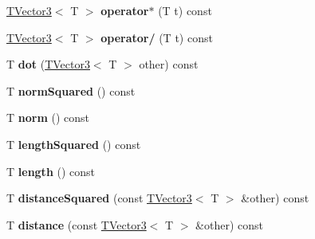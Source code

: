 \begin{DoxyCompactItemize}
\item 
\hyperlink{classAudio_1_1TVector3}{T\+Vector3}$<$ T $>$ {\bfseries operator$\ast$} (T t) const \hypertarget{classAudio_1_1TVector3_a581ab47cd6093c0aee581de38e1a16db}{}\label{classAudio_1_1TVector3_a581ab47cd6093c0aee581de38e1a16db}

\item 
\hyperlink{classAudio_1_1TVector3}{T\+Vector3}$<$ T $>$ {\bfseries operator/} (T t) const \hypertarget{classAudio_1_1TVector3_a422ce062d4d74beb7007a78c7d772594}{}\label{classAudio_1_1TVector3_a422ce062d4d74beb7007a78c7d772594}

\item 
T {\bfseries dot} (\hyperlink{classAudio_1_1TVector3}{T\+Vector3}$<$ T $>$ other) const \hypertarget{classAudio_1_1TVector3_a5aaa68fc33a2401c757ae2b02823007c}{}\label{classAudio_1_1TVector3_a5aaa68fc33a2401c757ae2b02823007c}

\item 
T {\bfseries norm\+Squared} () const \hypertarget{classAudio_1_1TVector3_a72ce6a388a36332a3b3a05c8e5144eef}{}\label{classAudio_1_1TVector3_a72ce6a388a36332a3b3a05c8e5144eef}

\item 
T {\bfseries norm} () const \hypertarget{classAudio_1_1TVector3_a92d101dc0ac2ddaaf2f60a294fe7cbb3}{}\label{classAudio_1_1TVector3_a92d101dc0ac2ddaaf2f60a294fe7cbb3}

\item 
T {\bfseries length\+Squared} () const \hypertarget{classAudio_1_1TVector3_a755c368a4641de0e90f09072288db39c}{}\label{classAudio_1_1TVector3_a755c368a4641de0e90f09072288db39c}

\item 
T {\bfseries length} () const \hypertarget{classAudio_1_1TVector3_ac62e57ca3642c2887dcb8fd0532d8b1b}{}\label{classAudio_1_1TVector3_ac62e57ca3642c2887dcb8fd0532d8b1b}

\item 
T {\bfseries distance\+Squared} (const \hyperlink{classAudio_1_1TVector3}{T\+Vector3}$<$ T $>$ \&other) const \hypertarget{classAudio_1_1TVector3_acbe69a67ef5e67f66c14c6df07915a66}{}\label{classAudio_1_1TVector3_acbe69a67ef5e67f66c14c6df07915a66}

\item 
T {\bfseries distance} (const \hyperlink{classAudio_1_1TVector3}{T\+Vector3}$<$ T $>$ \&other) const \hypertarget{classAudio_1_1TVector3_a6b476b9bfa153ccf4e8171d6afbb3294}{}\label{classAudio_1_1TVector3_a6b476b9bfa153ccf4e8171d6afbb3294}


\end{DoxyCompactItemize}
